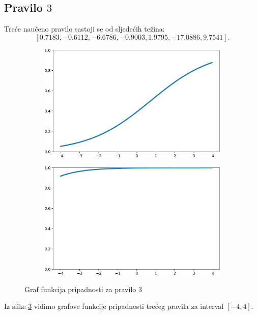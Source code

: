 \documentclass[12pt, a4paper, numeric]{article}
\begin{document}
\subsection{Pravilo $3$}
Treće naučeno pravilo sastoji se od sljedećih težina: 
\[[0.7183, -0.6112, -6.6786, -0.9003, 1.9795, -17.0886, 9.7541].\]
\begin{figure}[th!]
    \centering
    \begin{subfigure}{.5\textwidth}
        \centering
        \includegraphics[width=.9\linewidth]{img/A3}
        \captionsetup{justification=centering}
        \caption{}
        \label{fig:a3}
    \end{subfigure}%
    \begin{subfigure}{.5\textwidth}
        \centering
        \includegraphics[width=.9\linewidth]{img/B3}
        \captionsetup{justification=centering}
        \caption{}
        \label{fig:b3}
    \end{subfigure}
    \caption{Graf funkcija pripadnosti za pravilo 3}
    \label{fig:pripasdnost1}
\end{figure}
Iz slike \ref{fig:pripasdnost1} vidimo grafove funkcije pripadnosti trećeg pravila za interval $[-4, 4]$.
\end{document}
